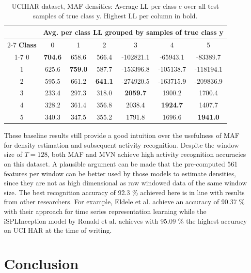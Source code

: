 \documentclass[11pt,titlepage,oneside,openany]{book}
\begin{document}
\begin{table}[H]
	\centering
	\tiny
	\begin{tabular}{c c c c c c c}
		\toprule
		\multirow[b]{2}{*}{} &
		\multicolumn{6}{c}{\bfseries Avg. per class LL grouped by samples of true class y}\\
		\cmidrule(lr){2-7}
		\bfseries Class & 0 & 1 & 2 & 3 & 4 & 5\\
		\cmidrule(lr){1-7}
		0 & \textbf{704.6} & 658.6 & 566.4 & -102821.1 & -65943.1 & -83389.7 \\
		1 & 625.6 & \textbf{759.0} & 587.7 & -153396.8 & -105138.7 & -118194.1 \\
		2 & 595.5 & 661.2 & \textbf{641.1} & -274920.5 & -163715.9 & -209836.9 \\
		3 & 233.4 & 297.3 & 318.0 & \textbf{2059.7} & 1900.2 & 1700.4 \\
		4 & 328.2 & 361.4 & 356.8 & 2038.4 & \textbf{1924.7} & 1407.7 \\
		5 & 340.3 & 347.5 & 355.2 & 1791.8 & 1696.6 & \textbf{1941.0} \\
		\bottomrule
	\end{tabular}
	\caption[UCI HAR average LL]{\label{tab:llu} UCIHAR dataset, MAF densities: Average LL per class c over all test samples of true class y. Highest LL per column in bold.}
\end{table}

\noindent These baseline results still provide a good intuition over the usefulness of MAF for density estimation and subsequent activity recognition. Despite the window size of $T=128$, both MAF and MVN achieve high activity recognition accuracies on this dataset. A plausible argument can be made that the pre-computed 561 features per window can be better used by those models to estimate densities, since they are not as high dimensional as raw windowed data of the same window size. The best recognition accuracy of 92.3 \% achieved here is in line with results from other researchers. For example, Eldele et al. \cite{eldele_time-series_2021} achieve an accuracy of 90.37 \% with their approach for time series representation learning while the iSPLInception model by Ronald et al. \cite{ronald_isplinception_2021} achieves with 95.09 \% the highest accuracy on UCI HAR at the time of writing.

\chapter{Conclusion}
\label{cha:conclusion}
\end{document}
